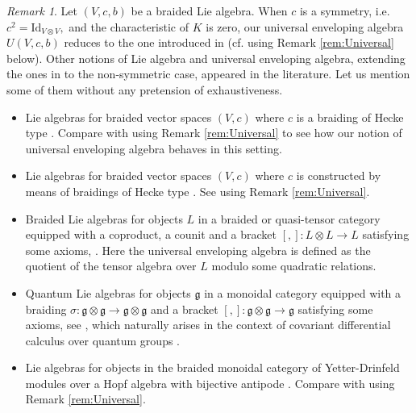 \documentclass[english]{amsart}
\numberwithin{equation}{section}
\numberwithin{figure}{section}
\theoremstyle{plain}
\theoremstyle{definition}
\theoremstyle{definition}
\theoremstyle{remark}
\theoremstyle{remark}
\newtheorem{rem}[thm]{Remark}
\theoremstyle{plain}
\theoremstyle{plain}
\theoremstyle{plain}
\begin{document}
\begin{rem}
Let $(V,c,b)$ be a braided Lie algebra.
When $c$ is a symmetry, i.e. $c^{2}=\mathrm{Id}_{V\otimes
V}, $ and the characteristic of $K$ is zero, our universal enveloping algebra $U(V,c,b)$ reduces
to the one introduced in \cite{Gu- Gen Trans Lie} (cf. \cite[Remark 6.4]{Ardizzoni-Universal} using Remark \ref{rem:Universal} below). Other notions of Lie
algebra and universal enveloping algebra, extending the ones in \cite{Gu- Gen Trans Lie} to the non-symmetric case, appeared in the literature. Let us mention some of them without any pretension of exhaustiveness.

\begin{itemize}
\item Lie algebras for braided vector spaces $\left( V,c\right) $ where $c$
is a braiding of Hecke type \cite[Definition 7.1]{Wa}. Compare with \cite[Section 6]{Ardizzoni-Universal} using  Remark \ref{rem:Universal} to see how our notion of universal enveloping algebra behaves in this setting.


\item Lie algebras for braided vector spaces $\left( V,c\right) $ where $c$
is constructed by means of braidings of Hecke type
\cite[Definition 1]{Gurevich: Hecke sym}. See \cite[Remark 3.6]{Ardizzoni-Stumbo-Qlie} using  Remark \ref{rem:Universal}.


\item Braided Lie algebras for objects $L$ in a braided or quasi-tensor category equipped with a coproduct, a counit and a bracket $[,]\colon L\otimes L\rightarrow L$ satisfying some axioms, \cite[Definition 4.1]{Majid-QuantumBrLiealg}. Here the universal enveloping algebra is defined as the quotient of the tensor algebra over $L$ modulo some quadratic relations.

\item Quantum Lie algebras for objects $\mathfrak{g}$ in a monoidal category equipped with a braiding $\sigma:\mathfrak{g}\otimes \mathfrak{g}\rightarrow \mathfrak{g}\otimes \mathfrak{g}$ and a bracket $[,]\colon \mathfrak{g}\otimes \mathfrak{g}\rightarrow \mathfrak{g}$ satisfying some axioms, see \cite[Definition 2.1]{Gomez-Majid-BraidedLie}, which naturally arises in the context of covariant differential calculus over quantum groups \cite[Theorems 5.3 and 5.4]{Woronowicz-DifCalcCompactMatr}.

\item Lie algebras for objects in the braided monoidal category of
Yetter-Drinfeld modules over a Hopf algebra with bijective antipode \cite[Definition 4.1]{Pareigis-On Lie}. Compare with \cite[Section 8]{Ardizzoni-Universal} using  Remark \ref{rem:Universal}.


\end{itemize}
\end{rem}
\end{document}
